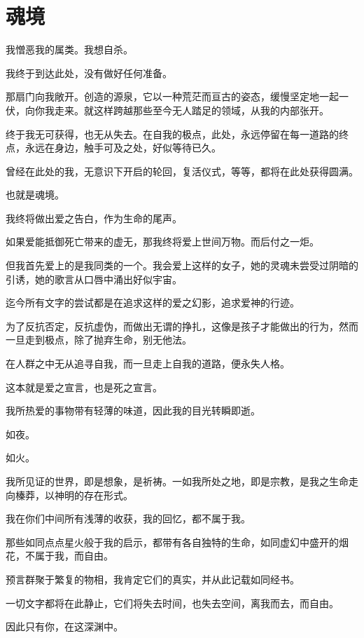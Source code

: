 \documentclass[UTF8]{article}
\begin{document}
\section{魂境}
\par 我憎恶我的属类。我想自杀。
\par 我终于到达此处，没有做好任何准备。
\par 那扇门向我敞开。创造的源泉，它以一种荒茫而亘古的姿态，缓慢坚定地一起一伏，向你我走来。就这样跨越那些至今无人踏足的领域，从我的内部张开。
\par 终于我无可获得，也无从失去。在自我的极点，此处，永远停留在每一道路的终点，永远在身边，触手可及之处，好似等待已久。
\par 曾经在此处的我，无意识下开启的轮回，复活仪式，等等，都将在此处获得圆满。
\par 也就是魂境。
\\[0.6cm]
\par 我终将做出爱之告白，作为生命的尾声。
\par 如果爱能抵御死亡带来的虚无，那我终将爱上世间万物。而后付之一炬。
\par 但我首先爱上的是我同类的一个。我会爱上这样的女子，她的灵魂未尝受过阴暗的引诱，她的歌言从口唇中涌出好似宇宙。
\par 迄今所有文字的尝试都是在追求这样的爱之幻影，追求爱神的行迹。
\par 为了反抗否定，反抗虚伪，而做出无谓的挣扎，这像是孩子才能做出的行为，然而一旦走到极点，除了抛弃生命，别无他法。
\par 在人群之中无从追寻自我，而一旦走上自我的道路，便永失人格。
\par 这本就是爱之宣言，也是死之宣言。
\\[0.6cm]
\par 我所热爱的事物带有轻薄的味道，因此我的目光转瞬即逝。
\par 如夜。
\par 如火。
\par 我所见证的世界，即是想象，是祈祷。一如我所处之地，即是宗教，是我之生命走向榛莽，以神明的存在形式。
\par 我在你们中间所有浅薄的收获，我的回忆，都不属于我。
\par 那些如同点点星火般于我的启示，都带有各自独特的生命，如同虚幻中盛开的烟花，不属于我，而自由。
\par 预言群聚于繁复的物相，我肯定它们的真实，并从此记载如同经书。
\par 一切文字都将在此静止，它们将失去时间，也失去空间，离我而去，而自由。
\\[0.6cm]
\par 因此只有你，在这深渊中。
\end{document}
